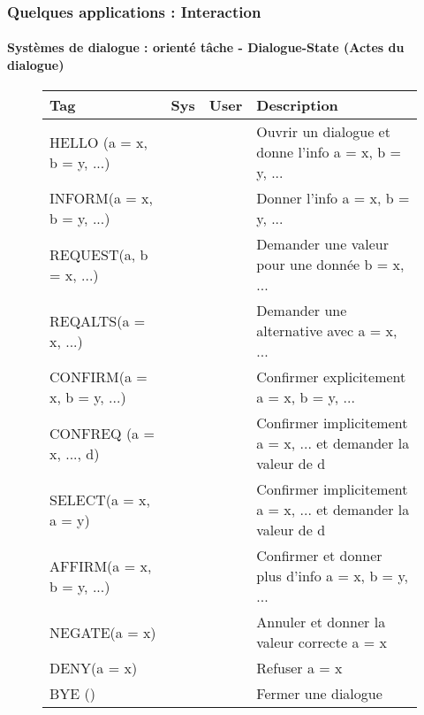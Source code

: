 \documentclass[xcolor=table]{beamer}
\begin{document}
\begin{frame}
	\frametitle{Quelques applications : Interaction}
	\framesubtitle{Systèmes de dialogue : orienté tâche - Dialogue-State (Actes du dialogue)}
	
	\vspace{-6pt}
	\begin{figure}
		\centering\tiny\bfseries
		\begin{tabular}{llll}
			\hline
			Tag & Sys & User & Description \\
			\hline
			HELLO (a = x, b = y, ...) & \CheckedBox & \CheckedBox & Ouvrir un dialogue et donne l'info a = x, b = y, ... \\
			INFORM(a = x, b = y, ...) & \CheckedBox & \CheckedBox & Donner l'info a = x, b = y, ... \\
			REQUEST(a, b = x, ...) & \CheckedBox & \CheckedBox & Demander une valeur pour une donnée b = x, ... \\
			REQALTS(a = x, ...) & \XBox & \CheckedBox & Demander une alternative avec a = x, ... \\
			CONFIRM(a = x, b = y, ...) & \CheckedBox & \CheckedBox & Confirmer explicitement a = x, b = y, ... \\
			CONFREQ (a = x, ..., d) & \CheckedBox & \XBox & Confirmer implicitement a = x, ... et demander la valeur de d \\
			SELECT(a = x, a = y) & \CheckedBox & \XBox & Confirmer implicitement a = x, ... et demander la valeur de d \\
			AFFIRM(a = x, b = y, ...) & \CheckedBox & \CheckedBox & Confirmer et donner plus d'info a = x, b = y, ... \\
			NEGATE(a = x) & \XBox & \CheckedBox & Annuler et donner la valeur correcte a = x \\
			DENY(a = x) & \XBox & \CheckedBox & Refuser a = x \\
			BYE () & \CheckedBox & \CheckedBox & Fermer une dialogue \\
			\hline
		\end{tabular}
	

\end{figure}
\end{frame}
\end{document}
